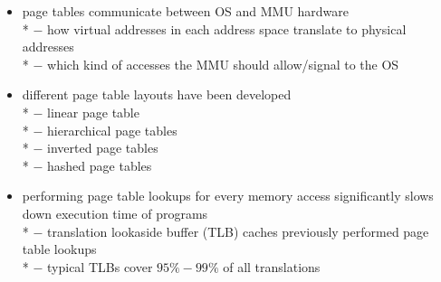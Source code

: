 \begin{summary}
  \begin{itemize}
    \item page tables communicate between OS and MMU hardware  \\*
      $ - $ how virtual addresses in each address space translate to physical addresses \\*
      $ - $ which kind of accesses the MMU should allow/signal to the OS
    \item different page table layouts have been developed  \\*
      $ - $ linear page table \\*
      $ - $ hierarchical page tables \\*
      $ - $ inverted page tables \\*
      $ - $ hashed page tables
    \item performing page table lookups for every memory access significantly slows down execution time of programs \\*
    $ - $ translation lookaside buffer (TLB) caches previously performed page table lookups \\*
    $ - $ typical TLBs cover $ 95\%-99\% $ of all translations
  \end{itemize}
\end{summary}